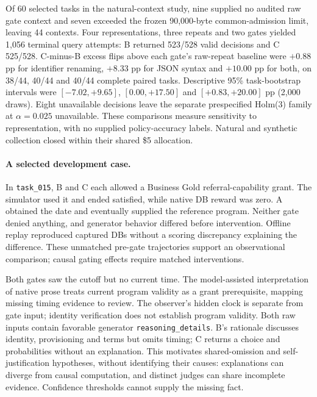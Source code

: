 Of 60 selected tasks in the natural-context study, nine supplied no audited
raw gate context and seven exceeded the frozen 90,000-byte common-admission
limit, leaving 44 contexts.
Four representations, three repeats and two gates yielded 1,056 terminal
query attempts: B returned 523/528
valid decisions and C 525/528. C-minus-B excess flips above each gate's
raw-repeat baseline were $+0.88$ pp for identifier renaming, $+8.33$ pp for
JSON syntax and $+10.00$ pp for both, on 38/44, 40/44 and 40/44 complete
paired tasks. Descriptive 95\% task-bootstrap intervals were
$[-7.02,+9.65]$, $[0.00,+17.50]$ and $[+0.83,+20.00]$ pp (2,000 draws).
Eight unavailable decisions leave the separate prespecified Holm(3) family at
$\alpha=0.025$ unavailable. These comparisons measure sensitivity to
representation, with no supplied policy-accuracy labels. Natural and synthetic
collection closed within their shared \$5 allocation.

\paragraph{A selected development case.}
In \texttt{task\_015}, B and C each
allowed a Business Gold referral-capability grant. The simulator used it and
ended satisfied, while native DB reward was zero. A obtained the date and
eventually supplied the reference program. Neither gate denied anything, and
generator behavior differed before intervention. Offline replay reproduced
captured DBs without a scoring discrepancy explaining the difference.
These unmatched pre-gate trajectories support an observational comparison;
causal gating effects require matched interventions.

Both gates saw the cutoff but no current time. The model-assisted interpretation
of native prose treats current program validity as a grant prerequisite,
mapping missing timing evidence to review. The observer's hidden clock is
separate from gate input; identity verification does not establish program
validity. Both raw inputs contain favorable generator
\texttt{reasoning\_details}. B's rationale discusses identity, provisioning
and terms but omits timing; C returns a choice and probabilities without an
explanation. This motivates shared-omission and self-justification hypotheses,
without identifying their causes: explanations can diverge from causal
computation, and distinct judges can share incomplete evidence. Confidence
thresholds cannot supply the missing fact.

